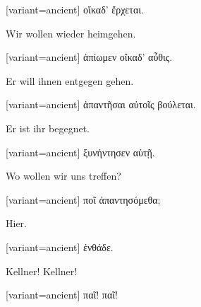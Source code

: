 \begin{greek}[variant=ancient]%
οἴκαδ' ἔρχεται.

\end{greek}%
\switchcolumn*

Wir wollen wieder heimgehen.

\switchcolumn

\begin{greek}[variant=ancient]%
ἀπίωμεν οἴκαδ' αὖθις.

\end{greek}%
\switchcolumn*

Er will ihnen entgegen gehen.

\switchcolumn

\begin{greek}[variant=ancient]%
ἀπαντῆσαι αὐτοῖς βούλεται.

\end{greek}%
\switchcolumn*

Er ist ihr begegnet.

\switchcolumn

\begin{greek}[variant=ancient]%
ξυνήντησεν αὐτῇ.

\end{greek}%
\switchcolumn*

Wo wollen wir uns treffen?

\switchcolumn

\begin{greek}[variant=ancient]%
ποῖ ἀπαντησόμεθα;

\end{greek}%
\switchcolumn*

Hier.

\switchcolumn

\begin{greek}[variant=ancient]%
ἐνθάδε.

\end{greek}%
\indent Kellner! Kellner!

\switchcolumn

\begin{greek}[variant=ancient]%
παῖ! παῖ!

\end{greek}%
\switchcolumn*

